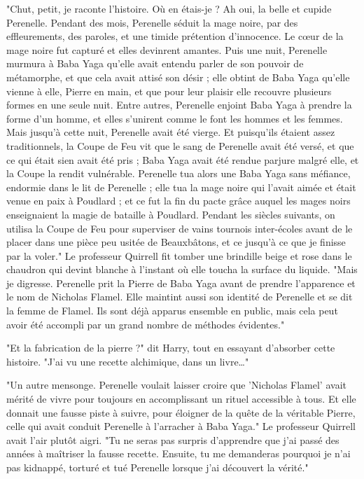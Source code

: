 "Chut, petit, je raconte l'histoire. Où en étais-je ? Ah oui, la belle et cupide Perenelle. Pendant des mois, Perenelle séduit la mage noire, par des effleurements, des paroles, et une timide prétention d'innocence. Le cœur de la mage noire fut capturé et elles devinrent amantes. Puis une nuit, Perenelle murmura à Baba Yaga qu'elle avait entendu parler de son pouvoir de métamorphe, et que cela avait attisé son désir ; elle obtint de Baba Yaga qu'elle vienne à elle, Pierre en main, et que pour leur plaisir elle recouvre plusieurs formes en une seule nuit. Entre autres, Perenelle enjoint Baba Yaga à prendre la forme d'un homme, et elles s'unirent comme le font les hommes et les femmes. Mais jusqu'à cette nuit, Perenelle avait été vierge. Et puisqu'ils étaient assez traditionnels, la Coupe de Feu vit que le sang de Perenelle avait été versé, et que ce qui était sien avait été pris ; Baba Yaga avait été rendue parjure malgré elle, et la Coupe la rendit vulnérable. Perenelle tua alors une Baba Yaga sans méfiance, endormie dans le lit de Perenelle ; elle tua la mage noire qui l'avait aimée et était venue en paix à Poudlard ; et ce fut la fin du pacte grâce auquel les mages noirs enseignaient la magie de bataille à Poudlard. Pendant les siècles suivants, on utilisa la Coupe de Feu pour superviser de vains tournois inter-écoles avant de le placer dans une pièce peu usitée de Beauxbâtons, et ce jusqu'à ce que je finisse par la voler." Le professeur Quirrell fit tomber une brindille beige et rose dans le chaudron qui devint blanche à l'instant où elle toucha la surface du liquide. "Mais je digresse. Perenelle prit la Pierre de Baba Yaga avant de prendre l'apparence et le nom de Nicholas Flamel. Elle maintint aussi son identité de Perenelle et se dit la femme de Flamel. Ils sont déjà apparus ensemble en public, mais cela peut avoir été accompli par un grand nombre de méthodes évidentes."

"Et la fabrication de la pierre ?" dit Harry, tout en essayant d'absorber cette histoire. "J'ai vu une recette alchimique, dans un livre…"

"Un autre mensonge. Perenelle voulait laisser croire que 'Nicholas Flamel' avait mérité de vivre pour toujours en accomplissant un rituel accessible à tous. Et elle donnait une fausse piste à suivre, pour éloigner de la quête de la véritable Pierre, celle qui avait conduit Perenelle à l'arracher à Baba Yaga." Le professeur Quirrell avait l'air plutôt aigri. "Tu ne seras pas surpris d'apprendre que j'ai passé des années à maîtriser la fausse recette. Ensuite, tu me demanderas pourquoi je n'ai pas kidnappé, torturé et tué Perenelle lorsque j'ai découvert la vérité."

